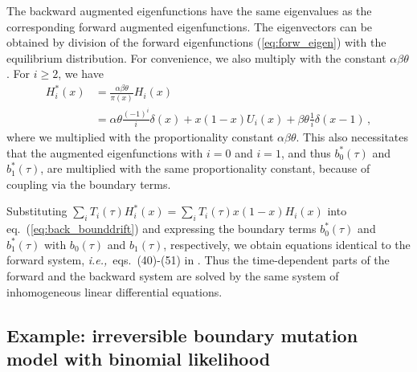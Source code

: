 \documentclass[preprint]{elsarticle}
\newcommand\ie{{\it i.e.,}}
\begin{document}
The backward augmented eigenfunctions have the same eigenvalues as the corresponding forward augmented eigenfunctions. The eigenvectors can be obtained by division of the forward eigenfunctions (\ref{eq:forw_eigen}) with the equilibrium distribution. For convenience, we also multiply with the constant ${\alpha\beta\theta}$. For $i\geq 2$, we have
\begin{equation}\label{eq:backw_eigen}
\begin{split}
    H_i^{*}(x)&= \frac{\alpha\beta\theta}{\pi(x)} H_i(x)\\
    &=\alpha\theta\tfrac{(-1)^i}{ i}\delta(x)+x(1-x)U_i(x)+\beta\theta\tfrac{1}{i}\delta(x-1)\,,
\end{split}
\end{equation}
where we multiplied with the proportionality constant $\alpha\beta\theta$. This also necessitates that the augmented eigenfunctions with $i=0$ and $i=1$, and thus $b_0^{*}(\tau)$ and $b_1^{*}(\tau)$, are multiplied with the same proportionality constant, because of coupling via the boundary terms. 

Substituting $\sum_i T_i(\tau)H_i^{*}(x)=\sum_i T_i(\tau)x(1-x)H_i(x)$ into eq.~(\ref{eq:back_bounddrift}) and expressing the boundary terms $b_0^{*}(\tau)$ and $b_1^{*}(\tau)$ with $b_0(\tau)$ and $b_1(\tau)$, respectively, we obtain equations identical to the forward system, \ie\ eqs.~(40)-(51) in \citet{Vogl16}. Thus the time-dependent parts of the forward and the backward system are solved by the same system of inhomogeneous linear differential equations. 

\subsection{Example: irreversible boundary mutation model with binomial likelihood}
\end{document}
